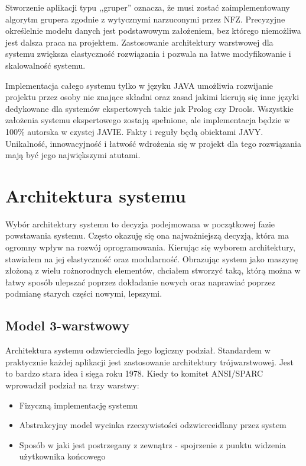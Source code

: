Stworzenie aplikacji typu ,,gruper'' oznacza, że musi zostać zaimplementowany algorytm grupera zgodnie z wytycznymi narzuconymi przez NFZ. Precyzyjne określelnie modelu danych jest podstawowym założeniem, bez którego niemożliwa jest dalsza praca na projektem. Zastosowanie architektury warstwowej dla systemu zwiększa elastyczność rozwiązania i pozwala na łatwe modyfikowanie i skalowalność systemu.

Implementacja całego systemu tylko w języku JAVA umożliwia rozwijanie projektu przez osoby nie znające składni oraz zasad jakimi kierują się inne języki dedykowane dla systemów ekspertowych takie jak Prolog czy Drools. Wszystkie założenia systemu ekspertowego zostają spełnione, ale implementacja będzie w 100\% autorska w czystej JAVIE. Fakty i reguły będą obiektami JAVY. Unikalność, innowacyjność i łatwość wdrożenia się w projekt dla tego rozwiązania mają być jego największymi atutami.



\section{Architektura systemu}
\label{sec:architekturaSystemu}

Wybór architektury systemu to decyzja podejmowana w początkowej fazie powstawania systemu. Często okazuję się ona najważniejszą decyzją, która ma ogromny wpływ na rozwój oprogramowania. Kierując się wyborem architektury, stawiałem na jej elastyczność oraz modularność. Obrazując system jako maszynę złożoną z wielu rożnorodnych elementów, chciałem stworzyć taką, którą można w łatwy sposób ulepszać poprzez dokładanie nowych oraz naprawiać poprzez podmianę starych części nowymi, lepszymi.

\subsection{Model 3-warstwowy}
\label{sec:model3warstwowy}
Architektura systemu odzwierciedla jego logiczny podział. Standardem w praktycznie każdej aplikacji jest zastosowanie architektury trójwarstwowej. Jest to bardzo stara idea i sięga roku 1978. Kiedy to komitet ANSI/SPARC wprowadził podział na trzy warstwy:
\begin{itemize}
 \item Fizyczną implementację systemu
 \item Abstrakcyjny model wycinka rzeczywistości odzwierceidlany przez system
 \item Sposób w jaki jest postrzegany z zewnątrz - spojrzenie z punktu widzenia użytkownika końcowego
\end{itemize}

